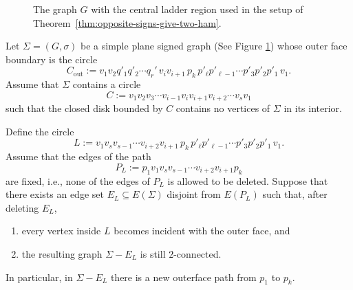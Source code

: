 \documentclass[12pt]{amsart}
\theoremstyle{theorem}%
\theoremstyle{definition}%
\begin{document}
\begin{figure}[H]

\caption{The graph $G$ with the central ladder region used in the setup of Theorem~\ref{thm:opposite-signs-give-two-ham}.}


\label{fig:placeholder9}
\end{figure}




Let $\Sigma=(G,\sigma)$ be a simple plane signed graph (See Figure \ref{fig:placeholder9}) whose outer face boundary is the circle
\[
C_{\mathrm{out}}
:=v_1v_2q'_1q'_2\cdots q_r'\,v_i v_{i+1}\,p_k\,p'_{\ell}p'_{\ell-1}\cdots p'_3p'_2p'_1\,v_1.
\]
Assume that $\Sigma$ contains a circle
\[
C:=v_1v_2v_3\cdots v_{i-1}v_i v_{i+1}v_{i+2}\cdots v_s v_1
\]
such that the closed disk bounded by $C$ contains no vertices of $\Sigma$ in its interior.

Define the circle
\[
L
:=v_1v_s v_{s-1}\cdots v_{i+2}v_{i+1}\,p_k\,p'_{\ell}p'_{\ell-1}\cdots p'_3p'_2p'_1\,v_1.
\]
Assume that the edges of the path
\[
P_L:=p_1v_1v_s v_{s-1}\cdots v_{i+2}v_{i+1}p_k
\]
are fixed, i.e., none of the edges of $P_L$ is allowed to be deleted.
Suppose that there exists an edge set $E_L\subseteq E(\Sigma)$ disjoint from $E(P_L)$ such that, after deleting $E_L$,
\begin{enumerate}
\item every vertex  inside $L$ becomes incident with the outer face, and
\item the resulting graph $\Sigma-E_L$ is still $2$-connected.
\end{enumerate}
In particular, in $\Sigma-E_L$ there is a new outerface path from $p_1$ to $p_k$.
\end{document}
